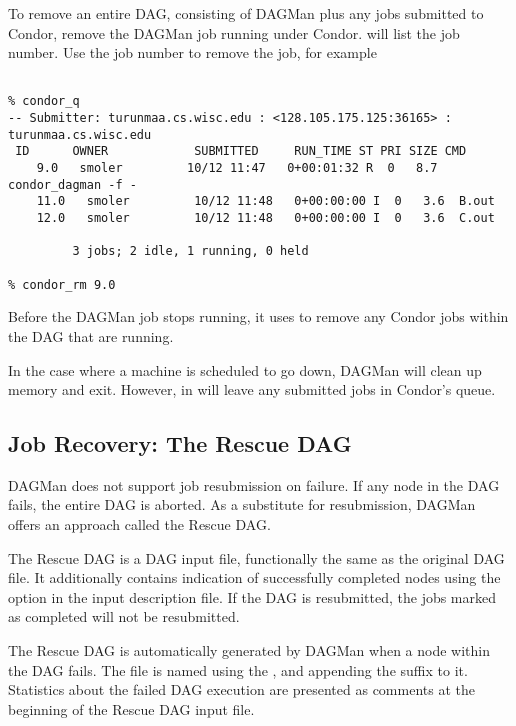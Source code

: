 To remove an entire DAG, consisting of DAGMan plus
any jobs submitted to Condor,
remove the DAGMan job running under Condor.
 will list the job number.
Use the job number to remove the job, for example

\begin{verbatim}

% condor_q
-- Submitter: turunmaa.cs.wisc.edu : <128.105.175.125:36165> : turunmaa.cs.wisc.edu
 ID      OWNER            SUBMITTED     RUN_TIME ST PRI SIZE CMD
    9.0   smoler         10/12 11:47   0+00:01:32 R  0   8.7  condor_dagman -f -
    11.0   smoler         10/12 11:48   0+00:00:00 I  0   3.6  B.out
    12.0   smoler         10/12 11:48   0+00:00:00 I  0   3.6  C.out

         3 jobs; 2 idle, 1 running, 0 held

% condor_rm 9.0
\end{verbatim}

Before the DAGMan job stops running, it uses 
to remove any Condor jobs within the DAG that are running.

In the case where a
machine is scheduled to go down,
DAGMan will clean up memory and exit.
However, in will leave any submitted jobs
in Condor's queue.

\subsection{Job Recovery:  The Rescue DAG}

DAGMan does not support job resubmission on failure.
If any node in the DAG fails,
the entire DAG is aborted.
As a substitute for resubmission,
DAGMan offers an approach called the Rescue DAG.

The Rescue DAG is a DAG input file,
functionally the same as the original DAG file.
It additionally contains indication of
successfully completed nodes using the 
option in the input description file.
If the DAG is resubmitted,
the jobs marked as completed will not be resubmitted.

The Rescue DAG is automatically generated by DAGMan when a node
within the DAG fails.
The file is named using the , and appending
the suffix  to it.
Statistics about the failed DAG execution are presented as
comments at the beginning of the Rescue DAG input file.

